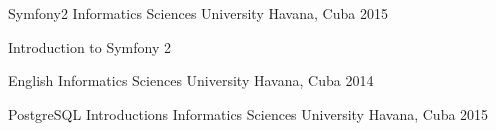 


\begin{cventries}


\cventry
{Symfony2} %
{Informatics Sciences University} %
{Havana, Cuba} %
{2015} %
{ %
\begin{cvitems}
\item {Introduction to Symfony 2}
\end{cvitems}
}


\cventry
{English} %
{Informatics Sciences University} %
{Havana, Cuba} %
{2014} %
{ %
}


\cventry
{PostgreSQL Introductions} %
{Informatics Sciences University} %
{Havana, Cuba} %
{2015} %
{ %
}


\end{cventries}
